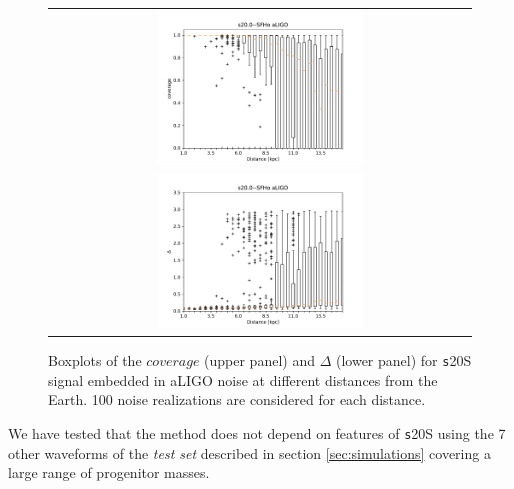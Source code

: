 \begin{figure}
  \centering
  \begin{tabular}{c}
    \includegraphics[width=0.5\textwidth]{plots/s20--SFHo_covpbb_boxplot_aLIGO} \\
    \includegraphics[width=0.5\textwidth]{plots/s20--SFHo_error_boxplot_aLIGO} \\
  \end{tabular}
    
 \caption{Boxplots of the $coverage$ (upper panel) and $\Delta$ (lower panel) for {\texttt s20S} signal embedded in aLIGO noise at different distances from the Earth. 100 noise realizations are considered for each distance.}
  \label{fig:s20results}
\end{figure}

We have tested that the method does not depend on features of {\texttt s20S} using the 7
other waveforms of the {\it test set} described in section \ref{sec:simulations} covering
a large range of progenitor masses.

